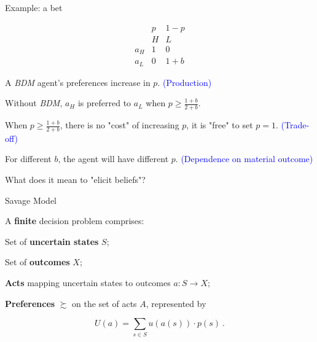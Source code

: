 \documentclass[usenames,dvipsnames,aspectratio=169,11pt,envcountsect, handout]{beamer}
\begin{document}
\begin{frame}{Example: a bet}

	\begin{minipage}{0.30\textwidth}
		\[
			\begin{array}{c|cc}
				           & p & 1 - p \\
				           & H & L     \\
				\hline a_H & 1 & 0     \\
				a_L        & 0 & 1 + b
			\end{array}
		\]
	\end{minipage}
	\begin{minipage}{0.60\textwidth}
		A \textit{BDM} agent's preferences increase in $p$.
		\vfill
		\center \textcolor{blue}{(Production)}
	\end{minipage}

	\vfill

	Without \textit{BDM}, $a_H$ is preferred to $a_L$ when $p \geq \frac{1 + b}{2 + b}$.

	\vfill

	When $p \geq \frac{1 + b}{2 + b}$, there is no "cost" of increasing $p$, it is "free" to set $p = 1$. \textcolor{blue}{(Trade-off)}

	\vfill

	For different $b$, the agent will have different $p$. \textcolor{blue}{(Dependence on material outcome)}

	\vfill

	What does it mean to "elicit beliefs"?

\end{frame}

\begin{frame}{Savage Model}

	A \textbf{finite} decision problem comprises:

	\vfill

	\begin{wideitemize}
		\item Set of \textbf{uncertain states} $S$;
		\item Set of \textbf{outcomes} $X$;
		\item \textbf{Acts} mapping uncertain states to outcomes $a: S \rightarrow X$;
		\item \textbf{Preferences} $\succsim$ on the set of acts $A$, represented by
	\end{wideitemize}

	\begin{equation}
		U(a) = \sum_{s \in S} u(a(s)) \cdot p(s) \: .
		\tag{SEU}
	\end{equation}

\end{frame}
\end{document}
